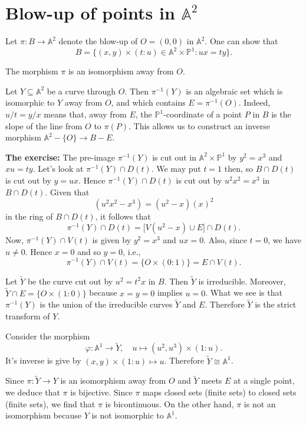 \section{Blow-up of points in $\mathbb{A}^2$}

Let $\pi : B \to \mathbb{A}^2$ denote the blow-up of $O = (0,0)$ in $\mathbb{A}^2$.
One can show that 
$$ B = \{ (x,y) \times (t : u) \in \mathbb{A}^2 \times \mathbb{P}^1 : ux=ty \}. $$

The morphism $\pi$ is an isomorphism away from $O$.

Let $Y \subseteq \mathbb{A}^2$ be a curve through $O$. Then $\pi^{-1}(Y)$ is an algebraic set which is isomorphic to $Y$ away from $O$, and which contains $E = \pi^{-1}(O)$. Indeed, $u/t = y/x$ means that, away from $E$, the $\mathbb{P}^1$-coordinate of a point $P$ in $B$ is the slope of the line from $O$ to $\pi(P)$. This allows us to construct an inverse morphism $\mathbb{A}^2 - \{O\} \to B - E$.

\textbf{The exercise:}
The pre-image $\pi^{-1}(Y)$ is cut out in $\mathbb{A}^2 \times \mathbb{P}^1$ by $y^2 = x^3$ and $xu=ty$. Let's look at $\pi^{-1}(Y) \cap D(t)$. We may put $t=1$ then, so $B \cap D(t)$ is cut out by $y=ux$. Hence $\pi^{-1}(Y) \cap D(t)$ is cut out by $u^2 x^2 = x^3$ in $B \cap D(t)$. Given that
$$(u^2x^2 - x^3) = (u^2-x)(x)^2$$
in the ring of $B \cap D(t)$, it follows that
$$ \pi^{-1}(Y) \cap D(t) = \Big[V(u^2-x) \cup E \Big] \cap D(t). $$
Now, $\pi^{-1}(Y) \cap V(t)$ is given by $y^2 = x^3$ and $ux=0$. Also, since $t=0$, we have $u \ne 0$. Hence $x=0$ and so $y=0$, i.e.,
$$\pi^{-1}(Y) \cap V(t) = \{ O \times (0:1) \} = E \cap V(t).$$

Let $\tilde{Y}$ be the curve cut out by $u^2 = t^2x$ in $B$. Then $\tilde{Y}$ is irreducible. Moreover, $\tilde{Y} \cap E = \{ O \times (1:0) \}$ because $x=y=0$ implies $u=0$.
What we see is that $\pi^{-1}(Y)$ is the union of the irreducible curves $\tilde{Y}$ and $E$. Therefore $\tilde{Y}$ is the strict transform of $Y$.

Consider the morphism
$$ \varphi : \mathbb{A}^1 \longrightarrow \tilde{Y}, \quad u \longmapsto (u^2, u^3) \times (1:u). $$
It's inverse is give by $(x,y) \times (1:u) \mapsto u$. Therefore $\tilde{Y} \cong \mathbb{A}^1$.

Since $\pi : \tilde{Y} \to Y$ is an isomorphism away from $O$ and $\tilde{Y}$ meets $E$ at a single point, we deduce that $\pi$ is bijective.
Since $\pi$ maps closed sets (finite sets) to closed sets (finite sets), we find that $\pi$ is bicontinuous.
On the other hand, $\pi$ is not an isomorphism because $Y$ is not isomorphic to $\mathbb{A}^1$.

